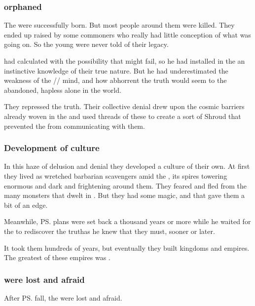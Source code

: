 \subsubsection{\Resphain orphaned}
The \resphain{} were successfully born. 
But most people around them were killed. 
They ended up raised by some \nephilic{} commoners who really had little conception of what was going on. 
So the young \resphain{} were never told of their legacy. 

\Daggerrain{} had calculated with the possibility that \Thanatzil{} might fail, so he had installed in the \resphain{} an instinctive knowledge of their true nature. 
But he had underestimated the weakness of the \nephilic/\human/\resphan{} mind, and how abhorrent the truth would seem to the abandoned, hapless \resphain{} alone in the world. 

They repressed the truth. 
Their collective denial drew upon the cosmic barriers already woven in the \firstbanewar{} and used threads of these to create a sort of Shroud that prevented the \banelords{} from communicating with them. 





\subsubsection{Development of culture}
In this haze of delusion and denial they developed a culture of their own. 
At first they lived as wretched barbarian scavengers amid the , its spires towering enormous and dark and frightening around them. 
They feared and fled from the many monsters that dwelt in \Nyx. 
But they had some magic, and that gave them a bit of an edge. 

Meanwhile, \ps{\Daggerrain}{} plans were set back a thousand years or more while he waited for the \resphain{} to rediscover the truth\dash as he knew that they must, sooner or later.

It took them hundreds of years, but eventually they built kingdoms and empires.
The greatest of these empires was \Merkyrah.




\subsubsection{\Resphain were lost and afraid}
After \ps{\Thanatzil} fall, the \resphain{} were lost and afraid. 

